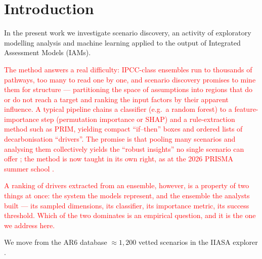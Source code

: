 \documentclass[sn-basic]{sn-jnl}%
\begin{document}



\maketitle


\section{Introduction}

In the present work we investigate scenario discovery, an activity of exploratory modelling analysis and machine
learning applied to the output of Integrated Assessment Models (IAMs). 



\textcolor{red}{%
The method answers a real difficulty: IPCC-class ensembles run to thousands of
pathways, too many to read one by one, and scenario discovery promises to mine
them for structure --- partitioning the space of assumptions into regions that
do or do not reach a target and ranking the input factors by their apparent
influence. A typical pipeline chains a classifier (e.g.\ a random forest) to a
feature-importance step (permutation importance or SHAP) and a rule-extraction
method such as PRIM, yielding compact ``if--then'' boxes and ordered lists of
decarbonisation ``drivers''. The promise is that pooling many scenarios and
analysing them collectively yields the ``robust insights'' no single scenario
can offer
\citep{Guivarch_Le_Gallic_Bauer_Fragkos_Huppmann_Jaxa-Rozen_Keppo_Kriegler_Krisztin_Marangoni_et_al._2022};
the method is now taught in its own right, as at the 2026 PRISMA summer school
\citep{university_of_geneva_prisma_2026}.}

\textcolor{red}{%
A ranking of drivers extracted from an ensemble, however, is a property of two
things at once: the system the models represent, and the ensemble the analysts
built --- its sampled dimensions, its classifier, its importance metric, its
success threshold. Which of the two dominates is an empirical question, and it
is the one we address here.}


We move from the AR6 database
\citep{Byers_Krey_Kriegler_Riahi_Schaeffer_Kikstra_Lamboll_Nicholls_Sandstad_Smith_et_al._2022}
$\approx 1,200$ vetted scenarios in the IIASA explorer
\citep{Kikstra_Nicholls_Smith_Lewis_Lamboll_Byers_Sandstad_Meinshausen_Gidden_Rogelj_et_al._2022}.
\end{document}
